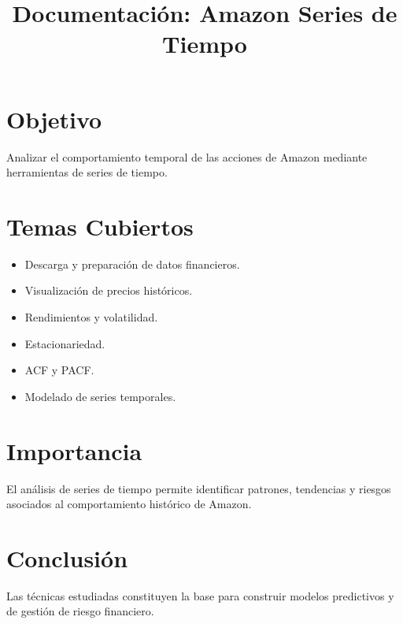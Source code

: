 \documentclass[11pt]{article}
\title{Documentación: Amazon Series de Tiempo}
\date{}
\begin{document}
\maketitle

\section{Objetivo}
Analizar el comportamiento temporal de las acciones de Amazon mediante herramientas de series de tiempo.

\section{Temas Cubiertos}
\begin{itemize}
\item Descarga y preparación de datos financieros.
\item Visualización de precios históricos.
\item Rendimientos y volatilidad.
\item Estacionariedad.
\item ACF y PACF.
\item Modelado de series temporales.
\end{itemize}

\section{Importancia}
El análisis de series de tiempo permite identificar patrones, tendencias y riesgos asociados al comportamiento histórico de Amazon.

\section{Conclusión}
Las técnicas estudiadas constituyen la base para construir modelos predictivos y de gestión de riesgo financiero.
\end{document}
